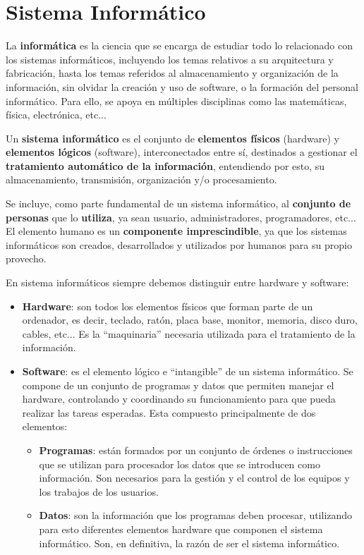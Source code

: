 \section{Sistema Informático}
La \textbf{informática} es la ciencia que se encarga de estudiar todo lo relacionado con los sistemas informáticos, incluyendo los temas relativos a su arquitectura y fabricación, hasta los temas referidos al almacenamiento y organización de la información, sin olvidar la creación y uso de software, o la formación del personal informático. Para ello, se apoya en múltiples disciplinas como las matemáticas, física, electrónica, etc...

Un \textbf{sistema informático} es el conjunto de \textbf{elementos físicos} (hardware) y \textbf{elementos lógicos} (software), interconectados entre sí, destinados a gestionar el \textbf{tratamiento automático de la información}, entendiendo por esto, su almacenamiento, transmisión, organización y/o procesamiento.

Se incluye, como parte fundamental de un sistema informático, al \textbf{conjunto de personas} que lo \textbf{utiliza}, ya sean usuario, administradores, programadores, etc... El elemento humano es un \textbf{componente imprescindible}, ya que los sistemas informáticos son creados, desarrollados y utilizados por humanos para su propio provecho.

En sistema informáticos siempre debemos distinguir entre hardware y software:

\begin{itemize}
    \item \textbf{Hardware}: son todos los elementos físicos que forman parte de un ordenador, es decir, teclado, ratón, placa base, monitor, memoria, disco duro, cables, etc... Es la ``maquinaria'' necesaria utilizada para el tratamiento de la información.
    \item \textbf{Software}: es el elemento lógico e ``intangible'' de un sistema informático. Se compone de un conjunto de programas y datos que permiten manejar el hardware, controlando y coordinando su funcionamiento para que pueda realizar las tareas esperadas. Esta compuesto principalmente de dos elementos:
    \begin{itemize}
        \item \textbf{Programas}: están formados por un conjunto de órdenes o instrucciones que se utilizan para procesador los datos que se introducen como información. Son necesarios para la gestión y el control de los equipos y los trabajos de los usuarios.
        \item \textbf{Datos}: son la información que los programas deben procesar, utilizando para esto diferentes elementos hardware que componen el sistema informático. Son, en definitiva, la razón de ser el sistema informático.
    \end{itemize}
\end{itemize}

